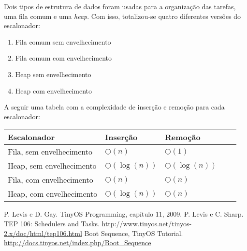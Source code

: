 \documentclass[a4paper,onecolumn, 10pt]{article}
\begin{document}
Dois tipos de estrutura de dados foram usadas para a organização das tarefas, uma fila comum e uma \textit{heap}. Com
isso, totalizou-se quatro diferentes versões do escalonador:
\begin{enumerate}
    \item Fila comum sem envelhecimento
    \item Fila comum com envelhecimento
    \item Heap sem envelhecimento
    \item Heap com envelhecimento
\end{enumerate}
A seguir uma tabela com a complexidade de inserção e remoção para cada escalonador:
\begin{center}
    \begin{tabular}{ | l | l | l | l | p{5cm} |}
    \hline
    Escalonador & Inserção & Remoção \\ \hline
    Fila, sem envelhecimento & $\bigcirc(n)$ & $\bigcirc(1)$ \\ \hline 
    Heap, sem envelhecimento & $\bigcirc(\log(n))$ & $\bigcirc(\log(n))$ \\ \hline
    Fila, com envelhecimento & $\bigcirc(n)$ & $\bigcirc(n)$ \\ \hline
    Heap, com envelhecimento & $\bigcirc(\log(n))$ & $\bigcirc(n)$ \\ \hline
    \end{tabular}
\end{center}
\pagebreak

\begin{thebibliography}{9}
 P. Levis e D. Gay. TinyOS Programming, capítulo 11, 2009.
 P. Levis e C. Sharp. TEP 106: Schedulers and Tasks.
                    \url{http://www.tinyos.net/tinyos-2.x/doc/html/tep106.html}
 Boot Sequence, TinyOS Tutorial. \url{http://docs.tinyos.net/index.php/Boot_Sequence}
\end{thebibliography}
\end{document}
